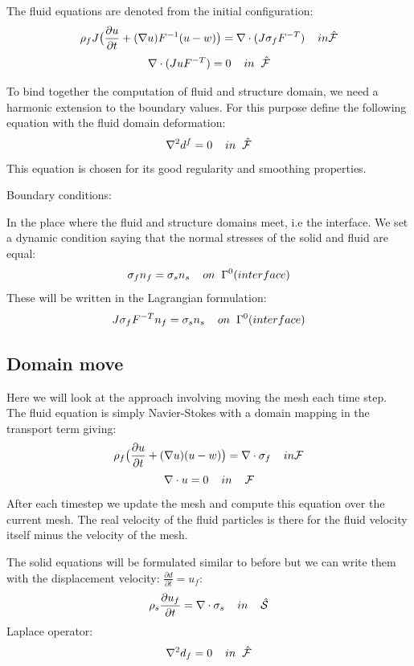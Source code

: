 The fluid equations are denoted from the initial configuration:
$$ \rho_f J \big( \frac{\partial u}{\partial t} + (\nabla u)F^{-1}(u-w)\big) = \nabla \cdot (J\sigma_f F^{-T} )\hspace{4mm} in \mathcal{\hat{F}}$$
$$ \nabla \cdot (J u F^{-T}) = 0 \hspace{4mm} in \hspace{2mm} \mathcal{\hat{F}}$$

To bind together the computation of fluid and structure domain, we need a harmonic extension to the boundary values. For this purpose define the following equation with the fluid domain deformation:
$$ \nabla^2 d^f = 0\hspace{4mm}in \hspace{2mm} \mathcal{\hat{F}}$$
This equation is chosen for its good regularity and smoothing properties.

Boundary conditions:

In the place where the fluid and structure domains meet, i.e the interface. We set a dynamic condition saying that the normal stresses of the solid and fluid are equal:
$$  \sigma_f n_f = \sigma_s n_s \hspace{4mm} on  \hspace{2mm}\Gamma^0 (interface)   $$
These will be written in the Lagrangian formulation:
$$  J\sigma_f F^{-T} n_f = \sigma_s  n_s \hspace{4mm} on  \hspace{2mm}\Gamma^0 (interface)   $$

\subsection*{Domain move}
Here we will look at the approach involving moving the mesh each time step. \\
The fluid equation is simply Navier-Stokes with a domain mapping in the transport term giving:
$$ \rho_f \big( \frac{\partial u}{\partial t} + (\nabla u)(u-w)\big) = \nabla \cdot \sigma_f \hspace{4mm} in \mathcal{F}$$
$$ \nabla \cdot u = 0  \hspace{4mm} in \hspace{4mm} \mathcal{F} $$
After each timestep we update the mesh and compute this equation over the current mesh. The real velocity of the fluid particles is there for the fluid velocity itself minus the velocity of the mesh. 

The solid equations will be formulated similar to before but we can write them with the displacement velocity: $ \frac{\partial d}{\partial t} = u_f $:
$$ \rho_s \frac{\partial u_f}{\partial t} = \nabla \cdot \sigma_s \hspace{4mm}in\hspace{4mm} \mathcal{\hat{S}} $$
Laplace operator:
$$ \nabla^2 d_f = 0\hspace{4mm}in \hspace{2mm} \mathcal{\hat{F}}$$

